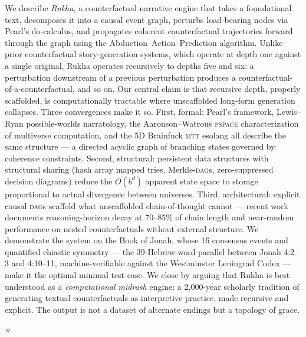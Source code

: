 \documentclass[11pt]{article}
\theoremstyle{rukha}
\newcommand{\diamondrule}{%
  \begin{center}\vspace{0.6em}%
  {\scriptsize $\diamond$}\vspace{0.6em}\end{center}}
\begin{document}
\noindent
We describe \emph{Rukha}, a counterfactual narrative engine that takes a
foundational text, decomposes it into a causal event graph, perturbs
load-bearing nodes via Pearl's do-calculus, and propagates coherent
counterfactual trajectories forward through the graph using the
Abduction–Action–Prediction algorithm. Unlike prior counterfactual
story-generation systems, which operate at depth one against a single
original, Rukha operates recursively to depths five and six: a
perturbation downstream of a previous perturbation produces a
counterfactual-of-a-counterfactual, and so on. Our central claim is that
recursive depth, properly scaffolded, is computationally tractable
where unscaffolded long-form generation collapses. Three convergences
make it so. First, formal: Pearl's framework, Lewis–Ryan possible-worlds
narratology, the Aaronson–Watrous \textsc{pspace} characterization of
multiverse computation, and the 5D Brainfuck \textsc{mtt} esolang all
describe the same structure --- a directed acyclic graph of branching
states governed by coherence constraints. Second, structural: persistent
data structures with structural sharing (hash array mapped tries,
Merkle-\textsc{dag}s, zero-suppressed decision diagrams) reduce the
$O(b^d)$ apparent state space to storage proportional to actual
divergence between universes. Third, architectural: explicit causal
\textsc{dag}s scaffold what unscaffolded chain-of-thought cannot ---
recent work documents reasoning-horizon decay at \mbox{70–85\%} of chain
length and near-random performance on nested counterfactuals without
external structure. We demonstrate the system on the Book of Jonah,
whose 16 consensus events and quantified chiastic symmetry --- the
39-Hebrew-word parallel between Jonah 4:2–3 and 4:10–11, machine-verifiable
against the Westminster Leningrad Codex --- make it the optimal minimal
test case. We close by arguing that Rukha is best understood as a
\emph{computational midrash} engine: a 2,000-year scholarly tradition of
generating textual counterfactuals as interpretive practice, made
recursive and explicit. The output is not a dataset of alternate
endings but a topology of grace.

\vspace{2.2em}
\diamondrule
\clearpage

\setcounter{page}{1}
\maketitle
\vspace{-0.4em}
\end{document}
